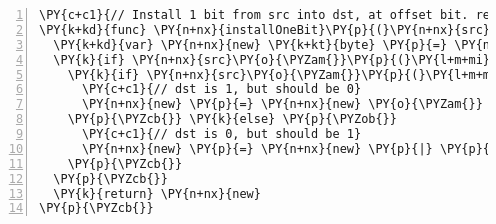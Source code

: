 \begin{Verbatim}[commandchars=\\\{\},numbers=left,firstnumber=1,stepnumber=1,codes={\catcode`\$=3\catcode`\^=7\catcode`\_=8},fontsize=\small,numbersep=6pt,xleftmargin=0.2in]
\PY{c+c1}{// Install 1 bit from src into dst, at offset bit. return new dst.}
\PY{k+kd}{func} \PY{n+nx}{installOneBit}\PY{p}{(}\PY{n+nx}{src} \PY{k+kt}{byte}\PY{p}{,} \PY{n+nx}{dst} \PY{k+kt}{byte}\PY{p}{,} \PY{n+nx}{bit} \PY{k+kt}{uint64}\PY{p}{)} \PY{k+kt}{byte} \PY{p}{\PYZob{}}
  \PY{k+kd}{var} \PY{n+nx}{new} \PY{k+kt}{byte} \PY{p}{=} \PY{n+nx}{dst}
  \PY{k}{if} \PY{n+nx}{src}\PY{o}{\PYZam{}}\PY{p}{(}\PY{l+m+mi}{1}\PY{o}{\PYZlt{}\PYZlt{}}\PY{n+nx}{bit}\PY{p}{)} \PY{o}{!=} \PY{n+nx}{dst}\PY{o}{\PYZam{}}\PY{p}{(}\PY{l+m+mi}{1}\PY{o}{\PYZlt{}\PYZlt{}}\PY{n+nx}{bit}\PY{p}{)} \PY{p}{\PYZob{}}
    \PY{k}{if} \PY{n+nx}{src}\PY{o}{\PYZam{}}\PY{p}{(}\PY{l+m+mi}{1}\PY{o}{\PYZlt{}\PYZlt{}}\PY{n+nx}{bit}\PY{p}{)} \PY{o}{==} \PY{l+m+mi}{0} \PY{p}{\PYZob{}}
      \PY{c+c1}{// dst is 1, but should be 0}
      \PY{n+nx}{new} \PY{p}{=} \PY{n+nx}{new} \PY{o}{\PYZam{}} \PY{p}{\PYZca{}}\PY{p}{(}\PY{l+m+mi}{1} \PY{o}{\PYZlt{}\PYZlt{}} \PY{n+nx}{bit}\PY{p}{)}
    \PY{p}{\PYZcb{}} \PY{k}{else} \PY{p}{\PYZob{}}
      \PY{c+c1}{// dst is 0, but should be 1}
      \PY{n+nx}{new} \PY{p}{=} \PY{n+nx}{new} \PY{p}{|} \PY{p}{(}\PY{l+m+mi}{1} \PY{o}{\PYZlt{}\PYZlt{}} \PY{n+nx}{bit}\PY{p}{)}
    \PY{p}{\PYZcb{}}
  \PY{p}{\PYZcb{}}
  \PY{k}{return} \PY{n+nx}{new}
\PY{p}{\PYZcb{}}
\end{Verbatim}
